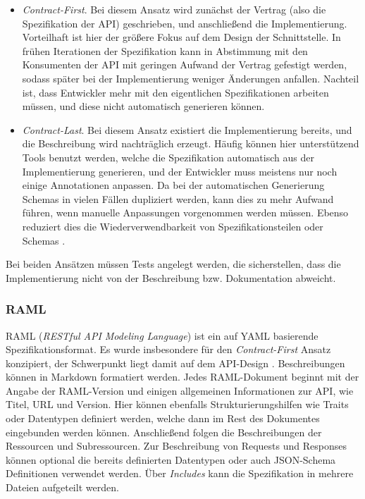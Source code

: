 \begin{itemize}
	\item \emph{Contract-First}. Bei diesem Ansatz wird zunächst der Vertrag (also die Spezifikation der API) geschrieben, und anschließend die Implementierung. Vorteilhaft ist hier der größere Fokus auf dem Design der Schnittstelle. In frühen Iterationen der Spezifikation kann in Abstimmung mit den Konsumenten der API mit geringen Aufwand der Vertrag gefestigt werden, sodass später bei der Implementierung weniger Änderungen anfallen. Nachteil ist, dass Entwickler mehr mit den eigentlichen Spezifikationen arbeiten müssen, und diese nicht automatisch generieren können.
	\item \emph{Contract-Last}. Bei diesem Ansatz existiert die Implementierung bereits, und die Beschreibung wird nachträglich erzeugt. Häufig können hier unterstützend Tools benutzt werden, welche die Spezifikation automatisch aus der Implementierung generieren, und der Entwickler muss meistens nur noch einige Annotationen anpassen. Da bei der automatischen Generierung Schemas in vielen Fällen dupliziert werden, kann dies zu mehr Aufwand führen, wenn manuelle Anpassungen vorgenommen werden müssen. Ebenso reduziert dies die Wiederverwendbarkeit von Spezifikationsteilen oder Schemas \parencite[1]{zhong2009contract}.
\end{itemize}

Bei beiden Ansätzen müssen Tests angelegt werden, die sicherstellen, dass die Implementierung nicht von der Beschreibung bzw. Dokumentation abweicht.
 
\subsubsection{RAML}
RAML (\emph{RESTful API Modeling Language}) ist ein auf YAML basierende Spezifikationsformat. Es wurde insbesondere für den \emph{Contract-First} Ansatz konzipiert, der Schwerpunkt liegt damit auf dem API-Design \parencites[277]{spichale2017api}[165]{tilkov2015rest}. Beschreibungen können in Markdown formatiert werden. Jedes RAML-Dokument beginnt mit der Angabe der RAML-Version und einigen allgemeinen Informationen zur API, wie Titel, URL und Version. Hier können ebenfalls Strukturierungshilfen wie Traits oder Datentypen definiert werden, welche dann im Rest des Dokumentes eingebunden werden können. Anschließend folgen die Beschreibungen der Ressourcen und Subressourcen. Zur Beschreibung von Requests und Responses können optional die bereits definierten Datentypen oder auch JSON-Schema Definitionen verwendet werden. Über \emph{Includes} kann die Spezifikation in mehrere Dateien aufgeteilt werden.

